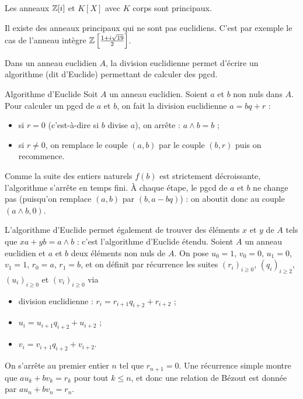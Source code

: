 \documentclass[]{report}
\begin{document}
\begin{cor}{}{}
    Les anneaux $\mathbb{Z}[i]$ et $K[X]$ avec $K$ corps sont principaux.
\end{cor}

\begin{re}{}{}
    Il existe des anneaux principaux qui ne sont pas euclidiens. C'est par exemple le cas de l'anneau intègre $\mathbb{Z}\left[\frac{1+i\sqrt{19}}{2}\right]$.
\end{re}

Dans un anneau euclidien $A$, la division euclidienne permet d'écrire un algorithme (dit d'Euclide) permettant de calculer des pgcd.

\begin{re}{Algorithme d'Euclide}{}
    Soit $A$ un anneau euclidien. Soient $a$ et $b$ non nuls dans $A$. Pour calculer un pgcd de $a$ et $b$, on fait la division euclidienne $a = bq + r$ :
    \begin{itemize}
        \item si $r = 0$ (c'est-à-dire si $b$ divise $a$), on arrête : $a \wedge b = b$ ;
        \item si $r \neq 0$, on remplace le couple $(a, b)$ par le couple $(b, r)$ puis on recommence.
    \end{itemize}
    Comme la suite des entiers naturels $f(b)$ est strictement décroissante, l'algorithme s'arrête en temps fini. À chaque étape, le pgcd de $a$ et $b$ ne change pas (puisqu'on remplace $(a, b)$ par $(b, a - bq)$) : on aboutit donc au couple $(a \wedge b, 0)$.

    L'algorithme d'Euclide permet également de trouver des éléments $x$ et $y$ de $A$ tels que $xa + yb = a \wedge b$ : c'est l'algorithme d'Euclide étendu. Soient $A$ un anneau euclidien et $a$ et $b$ deux éléments non nuls de $A$. On pose $u_0 = 1$, $v_0 = 0$, $u_1 = 0$, $v_1 = 1$, $r_0 = a$, $r_1 = b$, et on définit par récurrence les suites $(r_i)_{i \ge 0}$, $(q_i)_{i \ge 2}$, $(u_i)_{i \ge 0}$ et $(v_i)_{i \ge 0}$ via
    \begin{itemize}
        \item[(i)] division euclidienne : $r_i = r_{i+1}q_{i+2} + r_{i+2}$ ;
        \item[(ii)] $u_i = u_{i+1}q_{i+2} + u_{i+2}$ ;
        \item[(iii)] $v_i = v_{i+1}q_{i+2} + v_{i+2}$.
    \end{itemize}
    On s'arrête au premier entier $n$ tel que $r_{n+1} = 0$. Une récurrence simple montre que $au_k + bv_k = r_k$ pour tout $k \le n$, et donc une relation de Bézout est donnée par $au_n + bv_n = r_n$.
\end{re}
\end{document}
